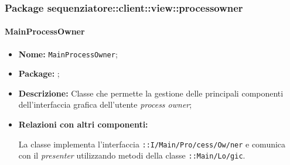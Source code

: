 \subsubsection{Package sequenziatore::client::view::processowner}

\paragraph{MainProcessOwner}
\begin{flushleft}
\begin{itemize}
\item \textbf{Nome:} \texttt{MainProcessOwner};
\item \textbf{Package:} \texttt{\viewAdmin{}};
\item \textbf{Descrizione:} Classe che permette la gestione delle principali componenti dell'interfaccia grafica dell'utente \textit{process owner};
\item \textbf{Relazioni con altri componenti:}
\begin{sloppypar}
La classe implementa l'interfaccia \texttt{\iViewAdmin{}::I\fshyp{}Main\fshyp{}Pro\fshyp{}cess\fshyp{}Ow\fshyp{}ner} e comunica con il \textit{presenter} utilizzando metodi della classe \texttt{\logicAdmin{}::Main\fshyp{}Lo\fshyp{}gic}.
\end{sloppypar}
\end{itemize}
\end{flushleft}

